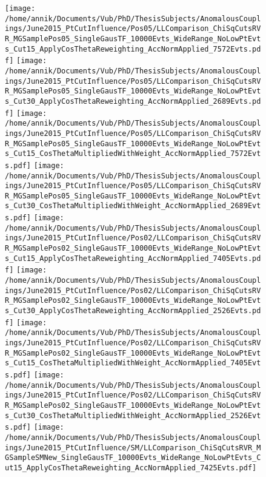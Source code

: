 \begin{figure}[h!t]
 \centering
 \texttt{[image: /home/annik/Documents/Vub/PhD/ThesisSubjects/AnomalousCouplings/June2015\_PtCutInfluence/Pos05/LLComparison\_ChiSqCutsRVR\_MGSamplePos05\_SingleGausTF\_10000Evts\_WideRange\_NoLowPtEvts\_Cut15\_ApplyCosThetaReweighting\_AccNormApplied\_7572Evts.pdf]}
 \texttt{[image: /home/annik/Documents/Vub/PhD/ThesisSubjects/AnomalousCouplings/June2015\_PtCutInfluence/Pos05/LLComparison\_ChiSqCutsRVR\_MGSamplePos05\_SingleGausTF\_10000Evts\_WideRange\_NoLowPtEvts\_Cut30\_ApplyCosThetaReweighting\_AccNormApplied\_2689Evts.pdf]}
 \texttt{[image: /home/annik/Documents/Vub/PhD/ThesisSubjects/AnomalousCouplings/June2015\_PtCutInfluence/Pos05/LLComparison\_ChiSqCutsRVR\_MGSamplePos05\_SingleGausTF\_10000Evts\_WideRange\_NoLowPtEvts\_Cut15\_CosThetaMultipliedWithWeight\_AccNormApplied\_7572Evts.pdf]}
 \texttt{[image: /home/annik/Documents/Vub/PhD/ThesisSubjects/AnomalousCouplings/June2015\_PtCutInfluence/Pos05/LLComparison\_ChiSqCutsRVR\_MGSamplePos05\_SingleGausTF\_10000Evts\_WideRange\_NoLowPtEvts\_Cut30\_CosThetaMultipliedWithWeight\_AccNormApplied\_2689Evts.pdf]}
 \texttt{[image: /home/annik/Documents/Vub/PhD/ThesisSubjects/AnomalousCouplings/June2015\_PtCutInfluence/Pos02/LLComparison\_ChiSqCutsRVR\_MGSamplePos02\_SingleGausTF\_10000Evts\_WideRange\_NoLowPtEvts\_Cut15\_ApplyCosThetaReweighting\_AccNormApplied\_7405Evts.pdf]}
 \texttt{[image: /home/annik/Documents/Vub/PhD/ThesisSubjects/AnomalousCouplings/June2015\_PtCutInfluence/Pos02/LLComparison\_ChiSqCutsRVR\_MGSamplePos02\_SingleGausTF\_10000Evts\_WideRange\_NoLowPtEvts\_Cut30\_ApplyCosThetaReweighting\_AccNormApplied\_2526Evts.pdf]}
 \texttt{[image: /home/annik/Documents/Vub/PhD/ThesisSubjects/AnomalousCouplings/June2015\_PtCutInfluence/Pos02/LLComparison\_ChiSqCutsRVR\_MGSamplePos02\_SingleGausTF\_10000Evts\_WideRange\_NoLowPtEvts\_Cut15\_CosThetaMultipliedWithWeight\_AccNormApplied\_7405Evts.pdf]}
 \texttt{[image: /home/annik/Documents/Vub/PhD/ThesisSubjects/AnomalousCouplings/June2015\_PtCutInfluence/Pos02/LLComparison\_ChiSqCutsRVR\_MGSamplePos02\_SingleGausTF\_10000Evts\_WideRange\_NoLowPtEvts\_Cut30\_CosThetaMultipliedWithWeight\_AccNormApplied\_2526Evts.pdf]}
 \texttt{[image: /home/annik/Documents/Vub/PhD/ThesisSubjects/AnomalousCouplings/June2015\_PtCutInfluence/SM/LLComparison\_ChiSqCutsRVR\_MGSampleSMNew\_SingleGausTF\_10000Evts\_WideRange\_NoLowPtEvts\_Cut15\_ApplyCosThetaReweighting\_AccNormApplied\_7425Evts.pdf]}

\end{figure}
